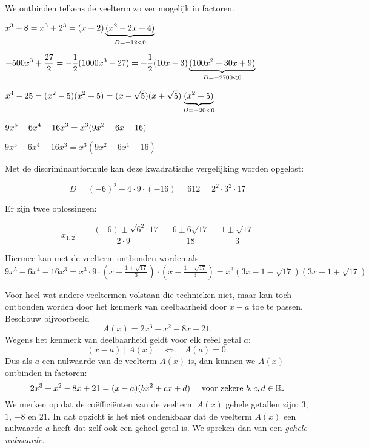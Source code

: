 \documentclass{ximera}
\begin{document}
\begin{example} 
We ontbinden telkens de veelterm zo ver mogelijk in factoren. 

\begin{question} \( \displaystyle x^3 + 8 = x^3 + 2^3 = (x+2)\underbrace{(x^2-2x+4)}_{D = -12 < 0}                                                         \) \end{question}
\begin{question} \( \displaystyle -500x^3 + \frac{27}{2} = -\frac{1}{2}(1000x^3 - 27) = -\frac{1}{2}(10x-3)\underbrace{(100x^2 + 30x + 9)}_{D = -2700 < 0} \) \end{question}
\begin{question} \( \displaystyle x^4-25 = (x^2 - 5)(x^2+5) = (x-\sqrt{5})(x+\sqrt{5})\underbrace{(x^2+5)}_{D = -20 < 0}                                   \) \end{question}
\begin{question} \( \displaystyle 9x^5 - 6x^4 - 16x^3 = x^3(9x^2-6x-16)                                                                                    \) \end{question}
\begin{question} \( 9x^5 - 6x^4 - 16x^3 = x^3(9x^2 - 6x^1 - 16) \)              

Met de discriminantformule kan deze kwadratische vergelijking worden opgelost: 

\[
D = (-6)^2-4\cdot 9 \cdot (-16) = 612 = 2^2 \cdot 3^2 \cdot 17 
\]

Er zijn twee oplossingen: 

\[
x_{1,2} = \frac{-(-6) \pm \sqrt{6^2 \cdot 17}}{2 \cdot 9} = \frac{6 \pm 6\sqrt{17}}{18} = \frac{1 \pm \sqrt{17}}{3} 
\]

Hiermee kan met de veelterm ontbonden worden als \(9x^5 - 6x^4 - 16x^3 = x^3 \cdot 9 \cdot \left(x-\frac{1+\sqrt{17}}{3}\right)\cdot\left(x-\frac{1-\sqrt{17}}{3}\right) = x^3(3x-1-\sqrt{17})(3x-1+\sqrt{17})\)

\end{question}
\end{example} 

Voor heel wat andere veeltermen volstaan die technieken niet, maar kan toch ontbonden worden door het kenmerk van deelbaarheid door $x-a$ toe te passen. Beschouw bijvoorbeeld
\[
A(x) = 2x^3 +x^2 - 8x + 21.
\]
Wegens het kenmerk van deelbaarheid geldt voor elk reëel getal $a$: 
\[
(x-a) \mid A(x) \quad \Leftrightarrow \quad A(a) = 0. 
\]
Dus als $a$ een nulwaarde van de veelterm $A(x)$ is, dan kunnen we $A(x)$ ontbinden in factoren:
\[
2x^3 +x^2 - 8x + 21 = (x-a)(bx^2 + cx + d) %
\quad 
\text{ voor zekere } b,c,d \in \R.
\]
We merken op dat de coëfficiënten van de veelterm $A(x)$ gehele getallen zijn: $3$, $1$, $-8$ en $21$. In dat opzicht is het niet ondenkbaar dat de veelterm $A(x)$ een nulwaarde $a$ heeft dat zelf ook een geheel getal is. We spreken dan van een \textit{ gehele nulwaarde}.
\end{document}
